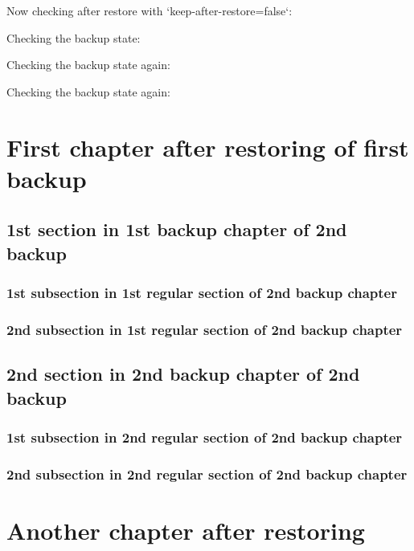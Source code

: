 \documentclass{book}
\begin{document}
Now checking after restore with `keep-after-restore=false`:

Checking the backup state: 

Checking the backup state again: 

Checking the backup state again: 





\chapter{First chapter after restoring of first backup}


\section{1st section in 1st backup chapter of 2nd backup}

\subsection{1st subsection in 1st regular section of 2nd backup chapter}
\subsection{2nd subsection in 1st regular section of 2nd backup chapter}

\section{2nd section in 2nd backup chapter of 2nd backup}

\subsection{1st subsection in 2nd regular section of 2nd backup chapter}
\subsection{2nd subsection in 2nd regular section of 2nd backup chapter}


\chapter{Another chapter after restoring}
\end{document}
